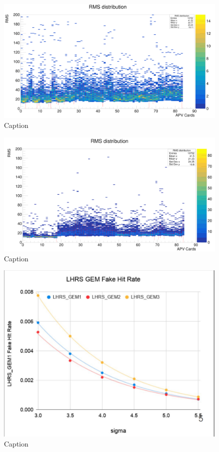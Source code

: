 \begin{figure}
    \centering
    \includegraphics[width=\textwidth]{images/chap5/LHRS_pedestal.png}
    \caption{Caption}
    \label{fig:my_label}
\end{figure}

\begin{figure}
    \centering
    \includegraphics[width=\textwidth]{images/chap5/rhrs_pedestal.png}
    \caption{Caption}
    \label{fig:my_label}
\end{figure}


\begin{figure}
    \centering
    \includegraphics[width=\textwidth]{images/chap5/lhrs_fake_hit_rate.png}
    \caption{Caption}
    \label{fig:my_label}
\end{figure}


